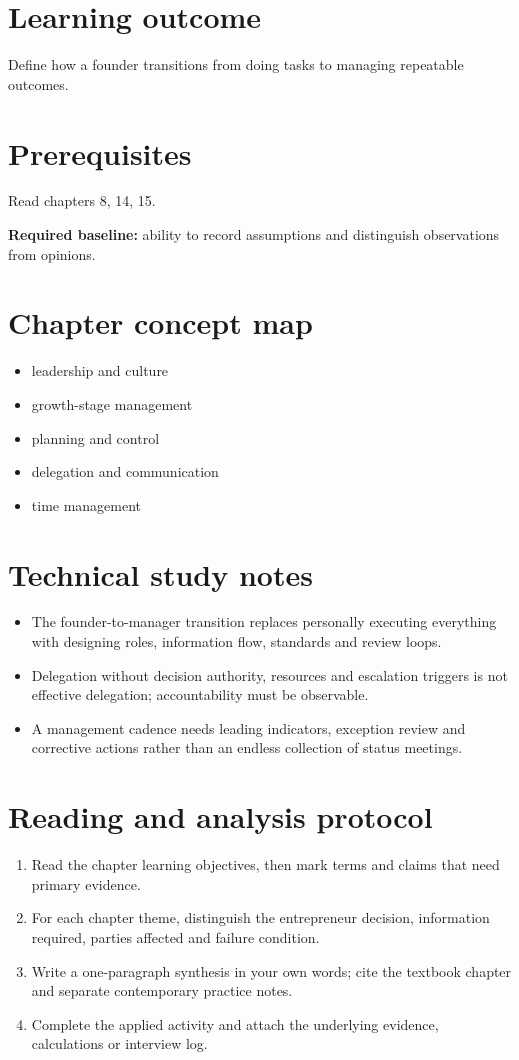 \documentclass[11pt,letterpaper]{article}
\begin{document}
\SuiteOpen
\section{Learning outcome}
Define how a founder transitions from doing tasks to managing repeatable outcomes.
\section{Prerequisites}
Read chapters 8, 14, 15.\par\textbf{Required baseline:} ability to record assumptions and distinguish observations from opinions.
\section{Chapter concept map}
\begin{itemize}[leftmargin=*,itemsep=3pt]
\item leadership and culture
\item growth-stage management
\item planning and control
\item delegation and communication
\item time management
\end{itemize}

\section{Technical study notes}
\begin{itemize}[leftmargin=*,itemsep=3pt]
\item The founder-to-manager transition replaces personally executing everything with designing roles, information flow, standards and review loops.
\item Delegation without decision authority, resources and escalation triggers is not effective delegation; accountability must be observable.
\item A management cadence needs leading indicators, exception review and corrective actions rather than an endless collection of status meetings.
\end{itemize}

\section{Reading and analysis protocol}
\begin{enumerate}[leftmargin=*,itemsep=5pt]
\item Read the chapter learning objectives, then mark terms and claims that need primary evidence.
\item For each chapter theme, distinguish the entrepreneur decision, information required, parties affected and failure condition.
\item Write a one-paragraph synthesis in your own words; cite the textbook chapter and separate contemporary practice notes.
\item Complete the applied activity and attach the underlying evidence, calculations or interview log.
\end{enumerate}
\end{document}
